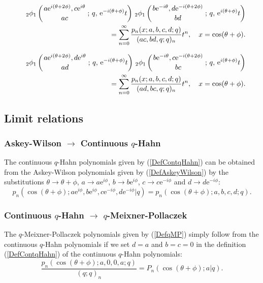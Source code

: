 \documentclass[envcountchap,graybox]{svmono}
\newcounter{rom}
\newcommand{\qhyp}[5]{\mbox{}_{#1}{\phi}_{#2}
\left(\genfrac{}{}{0pt}{}{#3}{#4}\,;\,q,\,#5\right)}
\newcommand{\e}{\textrm{e}}
\begin{document}
\begin{eqnarray}
\label{GenContqHahn2}
& &\qhyp{2}{1}{a\e^{i(\theta+2\phi)},c\e^{i\theta}}{ac}{\e^{-i(\theta+\phi)}t}\,
\qhyp{2}{1}{b\e^{-i\theta},d\e^{-i(\theta+2\phi)}}{bd}{\e^{i(\theta+\phi)}t}\nonumber\\
& &{}=\sum_{n=0}^{\infty}\frac{p_n(x;a,b,c,d;q)}{(ac,bd,q;q)_n}t^n,\quad x=\cos(\theta+\phi).
\end{eqnarray}

\begin{eqnarray}
\label{GenContqHahn3}
& &\qhyp{2}{1}{a\e^{i(\theta+2\phi)},d\e^{i\theta}}{ad}{\e^{-i(\theta+\phi)}t}\,
\qhyp{2}{1}{b\e^{-i\theta},c\e^{-i(\theta+2\phi)}}{bc}{\e^{i(\theta+\phi)}t}\nonumber\\
& &{}=\sum_{n=0}^{\infty}\frac{p_n(x;a,b,c,d;q)}{(ad,bc,q;q)_n}t^n,\quad x=\cos(\theta+\phi).
\end{eqnarray}

\subsection*{Limit relations}

\subsubsection*{Askey-Wilson $\rightarrow$ Continuous $q$-Hahn}
The continuous $q$-Hahn polynomials given by (\ref{DefContqHahn}) can be obtained
from the Askey-Wilson polynomials given by (\ref{DefAskeyWilson}) by the substitutions
$\theta\rightarrow\theta+\phi$, $a\rightarrow a\e^{i\phi}$, $b\rightarrow b\e^{i\phi}$,
$c\rightarrow c\e^{-i\phi}$ and $d\rightarrow d\e^{-i\phi}$:
$$p_n(\cos(\theta+\phi);a\e^{i\phi},b\e^{i\phi},c\e^{-i\phi},d\e^{-i\phi}|q)=p_n(\cos(\theta+\phi);a,b,c,d;q).$$

\subsubsection*{Continuous $q$-Hahn $\rightarrow$ $q$-Meixner-Pollaczek}
The $q$-Meixner-Pollaczek polynomials given by (\ref{DefqMP}) simply follow
from the continuous $q$-Hahn polynomials if we set $d=a$ and $b=c=0$ in the
definition (\ref{DefContqHahn}) of the continuous $q$-Hahn polynomials:
\begin{equation}
\frac{p_n(\cos(\theta+\phi);a,0,0,a;q)}{(q;q)_n}=P_n(\cos(\theta+\phi);a|q).
\end{equation}
\end{document}
